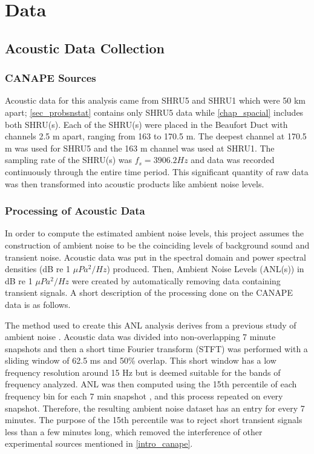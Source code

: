 \section{Data}

\subsection{Acoustic Data Collection} \label{intro_data_col}

\subsubsection{CANAPE Sources}
Acoustic data for this analysis came from SHRU5 and SHRU1 which were 50 km apart; \autoref{sec_probsnstat} contains only SHRU5 data while \autoref{chap_spacial} includes both SHRU(s). Each of the SHRU(s) were placed in the Beaufort Duct with channels 2.5 m apart, ranging from 163 to 170.5 m. The deepest channel at 170.5 m  was used for SHRU5 and the 163 m channel was used at SHRU1. The sampling rate of the SHRU(s) was $f_{s}=3906.2 Hz$ and data was recorded continuously through the entire time period. This significant quantity of raw data was then transformed into acoustic products like ambient noise levels. 


\subsubsection{Processing of Acoustic Data}
In order to compute the estimated ambient noise levels, this project assumes the construction of ambient noise to be the coinciding levels of background sound and transient noise. Acoustic data was put in the spectral domain and power spectral densities (dB re 1 $\mu Pa^{2}/Hz$) produced. Then, Ambient Noise Levels (ANL(s)) in dB re 1 $\mu Pa^{2}/Hz$ were created \parencite{carey2011ocean} by automatically removing data containing transient signals. A short description of the processing done on the CANAPE data is as follows.

The method used to create this ANL analysis derives from a previous study of ambient noise \parencite{bazile2013under}. Acoustic data was divided into non-overlapping 7 minute snapshots and then a short time Fourier transform (STFT) was performed with a sliding window of 62.5 ms and 50\% overlap. This short window has a low frequency resolution around 15 Hz but is deemed suitable for the bands of frequency analyzed. ANL was then computed using the 15th percentile of each frequency bin for each 7 min snapshot \parencite{huillery2008description}, and this process repeated on every snapshot. Therefore, the resulting ambient noise dataset has an entry for every 7 minutes. The purpose of the 15th percentile was to reject short transient signals less than a few minutes long, which removed the interference of other experimental sources mentioned in \autoref{intro_canape}.

